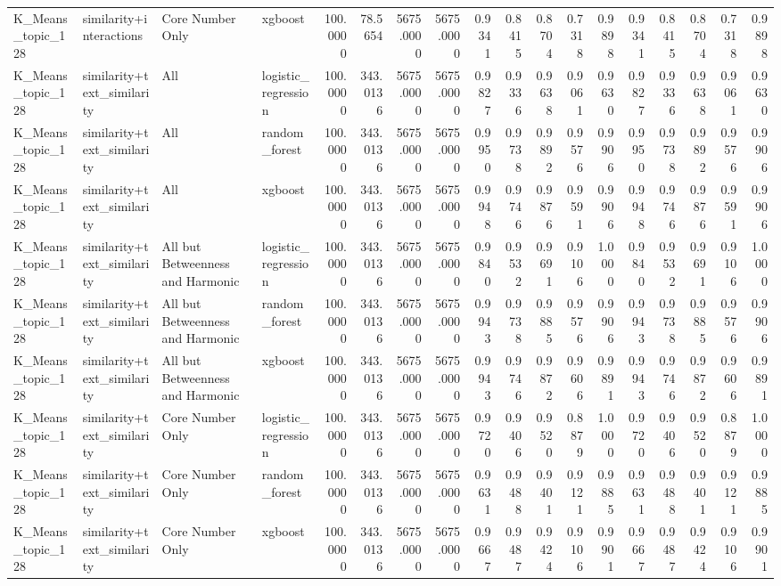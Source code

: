 \begin{tabular}{llllrrrrrrrrrrrrrr}
K_Means_topic_128 & similarity+interactions & Core Number Only & xgboost & 100.0000 & 78.5654 & 5675.0000 & 5675.0000 & 0.9341 & 0.8415 & 0.8704 & 0.7318 & 0.9898 & 0.9341 & 0.8415 & 0.8704 & 0.7318 & 0.9898 \\
K_Means_topic_128 & similarity+text_similarity & All & logistic_regression & 100.0000 & 343.0136 & 5675.0000 & 5675.0000 & 0.9827 & 0.9336 & 0.9638 & 0.9061 & 0.9630 & 0.9827 & 0.9336 & 0.9638 & 0.9061 & 0.9630 \\
K_Means_topic_128 & similarity+text_similarity & All & random_forest & 100.0000 & 343.0136 & 5675.0000 & 5675.0000 & 0.9950 & 0.9738 & 0.9892 & 0.9576 & 0.9906 & 0.9950 & 0.9738 & 0.9892 & 0.9576 & 0.9906 \\
K_Means_topic_128 & similarity+text_similarity & All & xgboost & 100.0000 & 343.0136 & 5675.0000 & 5675.0000 & 0.9948 & 0.9746 & 0.9876 & 0.9591 & 0.9906 & 0.9948 & 0.9746 & 0.9876 & 0.9591 & 0.9906 \\
K_Means_topic_128 & similarity+text_similarity & All but Betweenness and Harmonic & logistic_regression & 100.0000 & 343.0136 & 5675.0000 & 5675.0000 & 0.9840 & 0.9532 & 0.9691 & 0.9106 & 1.0000 & 0.9840 & 0.9532 & 0.9691 & 0.9106 & 1.0000 \\
K_Means_topic_128 & similarity+text_similarity & All but Betweenness and Harmonic & random_forest & 100.0000 & 343.0136 & 5675.0000 & 5675.0000 & 0.9943 & 0.9738 & 0.9885 & 0.9576 & 0.9906 & 0.9943 & 0.9738 & 0.9885 & 0.9576 & 0.9906 \\
K_Means_topic_128 & similarity+text_similarity & All but Betweenness and Harmonic & xgboost & 100.0000 & 343.0136 & 5675.0000 & 5675.0000 & 0.9943 & 0.9746 & 0.9872 & 0.9606 & 0.9891 & 0.9943 & 0.9746 & 0.9872 & 0.9606 & 0.9891 \\
K_Means_topic_128 & similarity+text_similarity & Core Number Only & logistic_regression & 100.0000 & 343.0136 & 5675.0000 & 5675.0000 & 0.9720 & 0.9406 & 0.9520 & 0.8879 & 1.0000 & 0.9720 & 0.9406 & 0.9520 & 0.8879 & 1.0000 \\
K_Means_topic_128 & similarity+text_similarity & Core Number Only & random_forest & 100.0000 & 343.0136 & 5675.0000 & 5675.0000 & 0.9631 & 0.9488 & 0.9401 & 0.9121 & 0.9885 & 0.9631 & 0.9488 & 0.9401 & 0.9121 & 0.9885 \\
K_Means_topic_128 & similarity+text_similarity & Core Number Only & xgboost & 100.0000 & 343.0136 & 5675.0000 & 5675.0000 & 0.9667 & 0.9487 & 0.9424 & 0.9106 & 0.9901 & 0.9667 & 0.9487 & 0.9424 & 0.9106 & 0.9901 \\

\end{tabular}
